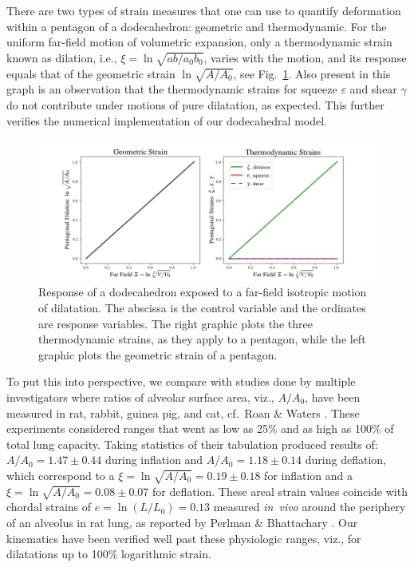 There are two types of strain measures that one can use to quantify deformation within a pentagon of a dodecahedron: geometric and thermo\-dynamic.  For the uniform far-field motion of volumetric expansion, only a thermo\-dynamic strain known as dilation, i.e., $\xi = \ln \sqrt{ab/a_0b_0}$, varies with the motion, and its response equals that of the geometric strain $\ln \sqrt{A / A_0}$, see Fig.~\ref{figDilatation2}.  Also present in this graph is an observation that the thermo\-dynamic strains for squeeze $\varepsilon$ and shear $\gamma$ do not contribute under motions of pure dilatation, as expected.  This further verifies the numerical implementation of our dodecahedral model.

\begin{figure}
	\centering
	\includegraphics[width=\textwidth]{figures/dilatationGeoVsThermo.jpg}
	\caption{Response of a dodecahedron exposed to a far-field isotropic motion of dilatation.  The abscissa is the control variable and the ordinates are response variables. The right graphic plots the three thermo\-dynamic strains, as they apply to a pentagon, while the left graphic plots the geometric strain of a pentagon.}
	\label{figDilatation2}
\end{figure}

To put this into perspective, we compare with studies done by multiple investigators where ratios of alveolar surface area, viz., $A/A_0$, have been measured in rat, rabbit, guinea pig, and cat, cf.\ Roan \& Waters \cite[Table~1]{RoanWaters11}.  These experiments considered ranges that went as low as 25\% and as high as 100\% of total lung capacity.  Taking statistics of their tabulation produced results of: $A/A_0 = 1.47 \pm 0.44$ during inflation and $A/A_0 = 1.18 \pm 0.14$ during deflation, which correspond to a $\xi = \ln\sqrt{A/A_0} = 0.19 \pm 0.18$ for inflation and a $\xi = \ln\sqrt{A/A_0} = 0.08 \pm 0.07$ for deflation.  These areal strain values coincide with chordal strains of $e=\ln(L/L_0) = 0.13$ measured \textit{in~vivo\/} around the periphery of an alveolus in rat lung, as reported by Perlman \& Bhattachary \cite{PerlmanBhattacharya07}.  Our kinematics have been verified well past these physiologic ranges, viz., for dilatations up to 100\% logarithmic strain. 

